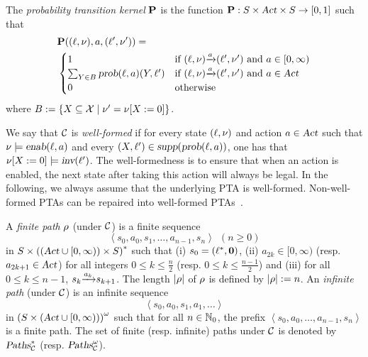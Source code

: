 \smallskip {}
The \emph{probability transition kernel} $\mathbf{P}$ is the function $\mathbf{P}:S\times\mbox{\sl Act}\times S\rightarrow[0,1]$ such that
\begin{align*}
    & \mathbf{P}((\ell,\nu),a,(\ell',\nu'))
        = \\
        & \begin{cases}
            1 &
                \mbox{if }{(\ell,\nu)}{\xrightarrow{a}}{(\ell',\nu')}\mbox{ and } a\in [0,\infty)\\
            \sum_{Y\in B}\mbox{\sl prob}(\ell,a)(Y,\ell') &
                \mbox{if }{(\ell,\nu)}{\xrightarrow{a}}{(\ell',\nu')}\mbox{ and } a\in\mbox{\sl Act} \\
            0 &
                \mbox{otherwise}
        \end{cases}
\end{align*}
where $B:=\{X\subseteq\mathcal{X}\mid \nu'={\nu}{\left[X:=0\right]}\}$.

\smallskip {} We say that $\mathcal{C}$ is \emph{well-formed} if for every state $(\ell,\nu)$ and action $a\in\mbox{\sl Act}$ such that $\nu\models\mbox{\sl enab}(\ell,a)$ and every $(X,\ell')\in {\mbox{\sl supp}}(\mbox{\sl prob}(\ell,a))$, one has that ${\nu}{\left[X:=0\right]}\models\mbox{\sl inv}(\ell')$.
The well-formedness is to ensure that when an action is enabled, the next state after taking this action will always be legal. In the following, we always assume that the underlying PTA is well-formed. Non-well-formed PTAs can be repaired into well-formed PTAs~\cite{DBLP:journals/iandc/KwiatkowskaNSW07}.

\smallskip {}
A \emph{finite path} $\rho$ (under $\mathcal{C}$) is a finite sequence
\[
\left\langle s_0,a_0,s_1,\dots,a_{n-1},s_n\right\rangle~~(n\ge 0)
\]
in
$S\times{\left((\mbox{\sl Act}\cup[0,\infty))\times S\right)}^*$
such that (i) $s_0=(\ell^*,\mathbf{0})$,
(ii) $a_{2k}\in [0,\infty)$ (resp. $a_{2k+1}\in \mbox{\sl Act}$) for all integers $0\le k\le \frac{n}{2}$ (resp. $0\le k\le \frac{n-1}{2}$) and
(iii) for all $0\le k\le n-1$, ${s_k}{\xrightarrow{a_k}}{s_{k+1}}$.
The length $\left| \rho \right|$ of $\rho$ is defined by $\left| \rho \right|:=n$.
An \emph{infinite path} (under $\mathcal{C}$) is an infinite sequence
\[
\left\langle s_0,a_0,s_1,a_1,\dots\right\rangle
\]
in
${\left(S\times(\mbox{\sl Act}\cup[0,\infty))\right)}^\omega$
such that for all $n\in\mathbb{N}_0$, the prefix $\left\langle s_0,a_0,\dots,a_{n-1},s_n\right\rangle$ is a finite path.
The set of finite (resp. infinite) paths  under $\mathcal{C}$ is denoted by $\mbox{\sl Paths}^*_{\mathcal{C}}$ (resp. $\mbox{\sl Paths}^\omega_{\mathcal{C}}$).

